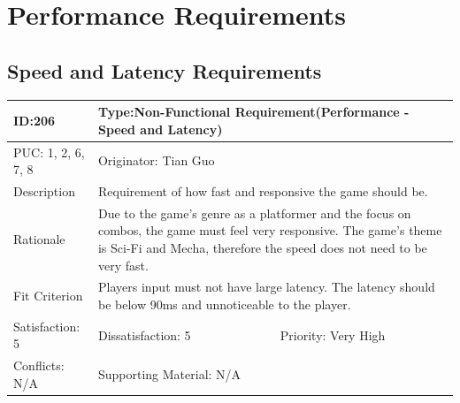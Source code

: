 \documentclass{article}
\begin{document}
\section{Performance Requirements}
\subsection{Speed and Latency Requirements}
\begin{table}[H]
    \begin{tabular}{|l|l|l|}
    \hline
    ID:206 & \multicolumn{2}{l|}{Type:Non-Functional Requirement(Performance - Speed and Latency)} \\ \hline
    PUC: 1, 2, 6, 7, 8  & \multicolumn{2}{l|}{Originator: Tian Guo} \\ \hline
    Description & \multicolumn{2}{m{0.85\textwidth}|}{Requirement of how fast and responsive the game should be.} \\ \hline
    Rationale & \multicolumn{2}{m{0.85\textwidth}|}{Due to the game’s genre as a platformer and the focus on combos, the game must feel very responsive. The game’s theme is Sci-Fi and Mecha, therefore the speed does not need to be very fast.} \\ \hline
    Fit Criterion & \multicolumn{2}{m{0.85\textwidth}|}{Players input must not have large latency. The latency should be below 90ms and unnoticeable to the player.} \\ \hline
    Satisfaction: 5 & Dissatisfaction: 5 & Priority: Very High \\ \hline
    Conflicts: N/A & \multicolumn{2}{l|}{Supporting Material: N/A} \\ \hline
    \end{tabular}
    \end{table}
    
\end{document}
